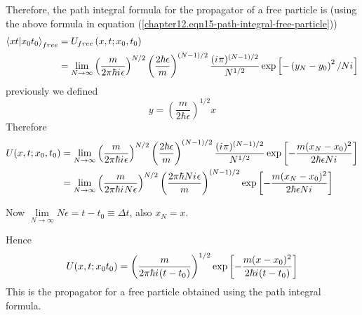 	Therefore, the path integral formula for the propagator of a free particle is (using the above formula in equation (\ref{chapter12.eqn15-path-integral-free-particle}))
	\begin{align}
		\braket{x t}{x_0 t_0}_{free} &= U_{free}\left(x, t; x_0, t_0\right) \nonumber\\
		&= \lim\limits_{N\rightarrow \infty} \left(\frac{m}{2\pi \hbar {i\mkern1mu} \epsilon}\right)^{N/2} \left(\frac{2\hbar\epsilon}{m}\right)^{(N-1)/2}  \frac{({i\mkern1mu} \pi)^{(N-1)/2}}{N^{1/2}} \exp\left[-\left(y_N - y_0\right)^2 / N{i\mkern1mu}
		\right]
	\end{align}
	previously we defined
	\begin{equation}
		y = \left(\frac{m}{2\hbar \epsilon}\right)^{1/2} x
	\end{equation}
	Therefore
	\begin{align*}
		U(x, t; x_0, t_0) 
		&= \lim\limits_{N\rightarrow \infty} \left(\frac{m}{2\pi\hbar{i\mkern1mu}\epsilon}\right)^{N/2} \left(\frac{2\hbar \epsilon}{m}\right)^{(N-1)/2} \frac{({i\mkern1mu} \pi)^{(N-1)/2}}{N^{1/2}} \exp \left[-\frac{m(x_N - x_0)^2}{2\hbar \epsilon N {i\mkern1mu}}\right] \\
		&= \lim\limits_{N\rightarrow \infty} \left(\frac{m}{2\pi\hbar{i\mkern1mu} N \epsilon}\right)^{N/2} \left(\frac{2\pi\hbar N {i\mkern1mu} \epsilon}{m}\right)^{(N-1)/2} \exp \left[-\frac{m(x_N - x_0)^2}{2\hbar \epsilon N {i\mkern1mu}}\right]
	\end{align*}
	
	Now $\lim\limits_{N\rightarrow \infty} N\epsilon = t-t_0 \equiv \Delta t$,
	also $x_N = x$.
	
	Hence
	\begin{equation}
		U(x,t; x_0 t_0) = \left(\frac{m}{2\pi \hbar {i\mkern1mu} (t-t_0)}\right)^{1/2} \exp\left[-\frac{m(x-x_0)^2}{2\hbar{i\mkern1mu} (t-t_0)}\right]
		\label{chapter12.eqn18-path-integral-free-particle}
	\end{equation}
	This is the propagator for a free particle obtained using the path integral formula.
	
